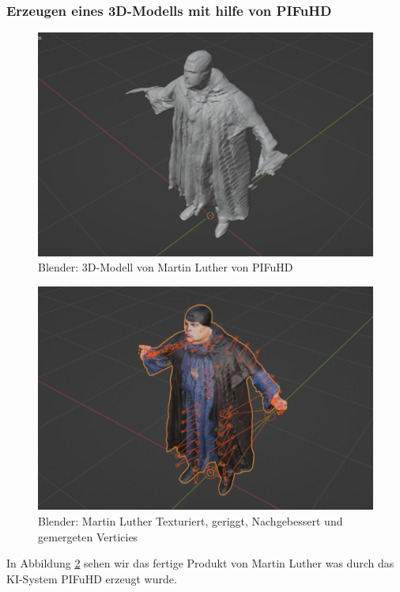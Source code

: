 \documentclass[10pt,a4paper,bibliography=totocnumbered,listof=totocnumbered]{scrartcl}
\begin{document}
\subsubsection{Erzeugen eines 3D-Modells mit hilfe von PIFuHD}
\begin{figure}
	\centering
	\includegraphics[width=14cm]{BilderFuerBA/Screenshot/BlenderMLVonPIFuHD105k.png}
	\caption{Blender: 3D-Modell von Martin Luther von PIFuHD}
	\label{BlenderMLVonPIFuHD105k}
\end{figure}
\begin{figure}
	\centering
	\includegraphics[width=14cm]{BilderFuerBA/Screenshot/BlenderMLGeriggtUndTexturiert95k.png}
	\caption{Blender: Martin Luther Texturiert, geriggt, Nachgebessert und gemergeten Verticies}
	\label{BlenderMLVonPIFuHD105k}
\end{figure}
In Abbildung \ref{BlenderMLVonPIFuHD105k} sehen wir das fertige Produkt von Martin Luther was durch das KI-System PIFuHD erzeugt wurde.
\end{document}
